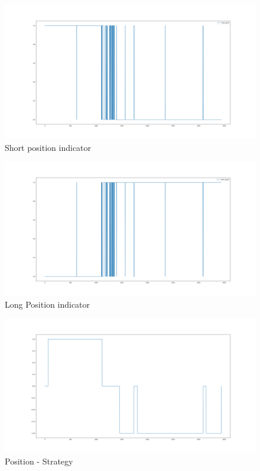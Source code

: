 \documentclass[12pt]{article}
\begin{document}
\begin{figure}[h!]
	\centering
  \includegraphics[width=\textwidth]{strategy3.png}
  \caption{Short position indicator}
  \label{fig:strat3}
\end{figure}
\begin{figure}[h!]
	\centering
  \includegraphics[width=\textwidth]{strategy4.png}
  \caption{Long Position indicator}
  \label{fig:strat4}
\end{figure}
\begin{figure}[h!]
	\centering
  \includegraphics[width=\textwidth]{strategy5.png}
  \caption{Position - Strategy}
  \label{fig:strat5}
\end{figure}
\end{document}
